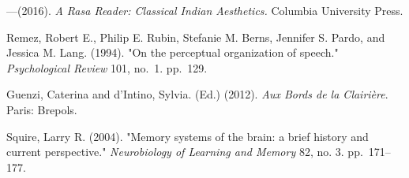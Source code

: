 \begin{thebibliography}{99}
---\kern3pt(2016). \textsl{A Rasa Reader: Classical Indian Aesthetics.} Columbia University Press.

Remez, Robert E., Philip E. Rubin, Stefanie M. Berns, Jennifer S. Pardo, and Jessica M. Lang. (1994). "On the perceptual organization of speech." \textsl{Psychological Review} 101, no.~1. pp.~129.

Guenzi, Caterina and d'Intino, Sylvia. (Ed.) (2012). \textsl{Aux Bords de la Clairière}. Paris: Brepols.

Squire, Larry R. (2004). "Memory systems of the brain: a brief history and current perspective." \textsl{Neurobiology of Learning and Memory} 82, no. 3. pp.~171--177.
\end{thebibliography}

